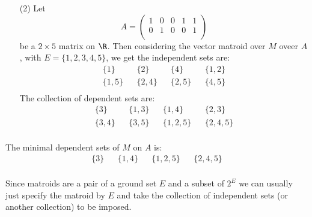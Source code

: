 \begin{example}
\begin{enumerate}
         \item[(2)] Let
             \begin{equation*}
                 A=\begin{pmatrix}
                    1   &   0   &   0   &   1   &   1   \\
                    0   &   1   &   0   &   0   &   1   \\
                   \end{pmatrix}
             \end{equation*}
             be a $2 \times 5$ matrix on $\R$. Then considering the vector
             matroid over $M$ oveer  $A$, with $E=\{1,2,3,4,5\}$, we get the
             independent sets are:
             \begin{align*}
                 \{1\}  && \{2\} && \{4\} && \{1,2\} \\
                \{1,5\} && \{2,4\} && \{2,5\} && \{4,5\} \\
             \end{align*}
             The collection of dependent sets are:
             \begin{align*}
                 \{3\} && \{1,3\} && \{1,4\} && \{2,3\} \\
                 \{3,4\} && \{3,5\} && \{1,2,5\} && \{2,4,5\} \\
             \end{align*}
    \end{enumerate}
    The minimal dependent sets of $M$ on  $A$ is:
    \begin{align*}
        \{3\} && \{1,4\} && \{1,2,5\} && \{2,4,5\} \\
    \end{align*}
\end{example}

\begin{remark}
    Since matroids are a pair of a ground set $E$ and a subset of $2^E$ we can
    usually just specify the matroid by $E$ and take the collection of
    independent sets (or another collection) to be imposed.
\end{remark}

